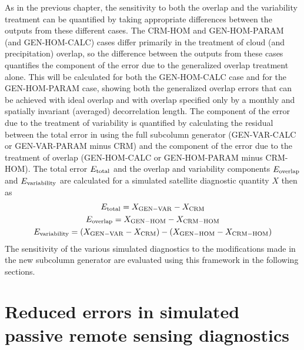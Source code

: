 As in the previous chapter, the sensitivity to both the overlap and the variability treatment can be quantified by taking appropriate differences between the outputs from these different cases. The CRM-HOM and GEN-HOM-PARAM (and GEN-HOM-CALC) cases differ primarily in the treatment of cloud (and precipitation) overlap, so the difference between the outputs from these cases quantifies the component of the error due to the generalized overlap treatment alone. This will be calculated for both the GEN-HOM-CALC case and for the GEN-HOM-PARAM case, showing both the generalized overlap errors that can be achieved with ideal overlap and with overlap specified only by a monthly and spatially invariant (averaged) decorrelation length. The component of the error due to the treatment of variability is quantified by calculating the residual between the total error in using the full subcolumn generator (GEN-VAR-CALC or GEN-VAR-PARAM minus CRM) and the component of the error due to the treatment of overlap (GEN-HOM-CALC or GEN-HOM-PARAM minus CRM-HOM). The total error $E_{\rm total}$ and the overlap and variability components $E_{\rm overlap}$ and $E_{\rm variability}$ are calculated for a simulated satellite diagnostic quantity $X$ then as
\begin{gather}
E_{\rm total} = X_{\rm GEN-VAR} - X_{\rm CRM} \\
E_{\rm overlap} = X_{\rm GEN-HOM} - X_{\rm CRM-HOM} \\
E_{\rm variability} = (X_{\rm GEN-VAR} - X_{\rm CRM}) - (X_{\rm GEN-HOM} - X_{\rm CRM-HOM})
\end{gather}
The sensitivity of the various simulated diagnostics to the modifications made in the new subcolumn generator are evaluated using this framework in the following sections.

\section{Reduced errors in simulated passive remote sensing diagnostics}
\label{subgrid2_passive_section}

